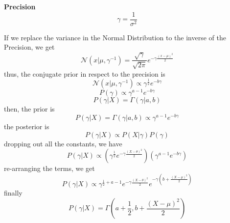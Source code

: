 \documentclass{article}
\begin{document}
\textbf{Precision}
\begin{equation}
    \gamma = \frac{1}{\sigma^2}
\end{equation}

If we replace the variance in the Normal Distribution to the inverse of the Precision, we get
\begin{equation}
    \mathcal{N}(x|\mu, \gamma^{-1}) = \frac{\sqrt{\gamma}}{\sqrt{2\pi}} e^{-\gamma\frac{(x - \mu)^2}{2}}    
\end{equation}
thus, the conjugate prior in respect to the precision is
\begin{equation}
    \mathcal{N}(x|\mu, \gamma^{-1}) \propto \gamma^{\frac{1}{2}}e^{-b\gamma}
\end{equation}
\begin{equation}
    P(\gamma) \propto \gamma^{a-1}e^{-b\gamma}
\end{equation}
\begin{equation}
    P(\gamma|X) = \Gamma(\gamma|a, b)
\end{equation}
then, the prior is
\begin{equation}
    P(\gamma|X) = \Gamma(\gamma|a, b) \propto  \gamma^{a-1}e^{-b\gamma}
\end{equation}
the posterior is
\begin{equation}
    P(\gamma|X) \propto P(X|\gamma)P(\gamma)
\end{equation}
dropping out all the constants, we have
\begin{equation}
    P(\gamma|X) \propto \left(\gamma^{\frac{1}{2}}e^{-\gamma \frac{(X - \theta)^2}{2}} \right) \left(\gamma^{a-1} e^{-b\gamma} \right)
\end{equation}
re-arranging the terms, we get
\begin{equation}
    P(\gamma|X) \propto \gamma^{\frac{1}{2} + a - 1}e^{-\gamma \frac{(X - \theta)^2}{2}} e^{-\gamma(b + \frac{(X - \mu)^2}{2})} 
\end{equation}
finally
\begin{equation}
    P(\gamma|X) = \Gamma(a + \frac{1}{2}, b + \frac{(X - \mu)^2}{2})
\end{equation}
\end{document}
